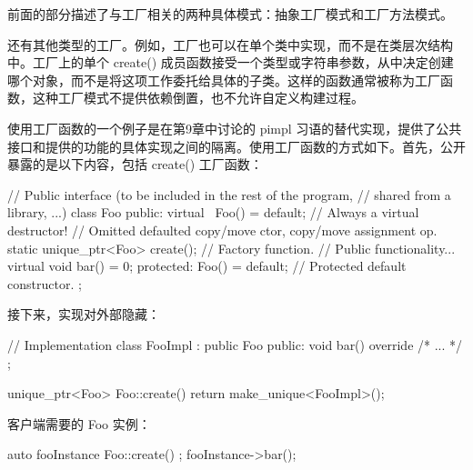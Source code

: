 前面的部分描述了与工厂相关的两种具体模式：抽象工厂模式和工厂方法模式。

还有其他类型的工厂。例如，工厂也可以在单个类中实现，而不是在类层次结构中。工厂上的单个 create() 成员函数接受一个类型或字符串参数，从中决定创建哪个对象，而不是将这项工作委托给具体的子类。这样的函数通常被称为工厂函数，这种工厂模式不提供依赖倒置，也不允许自定义构建过程。

使用工厂函数的一个例子是在第9章中讨论的 pimpl 习语的替代实现，提供了公共接口和提供的功能的具体实现之间的隔离。使用工厂函数的方式如下。首先，公开暴露的是以下内容，包括 create() 工厂函数：

\begin{cpp}
// Public interface (to be included in the rest of the program,
// shared from a library, ...)
class Foo
{
    public:
        virtual ~Foo() = default; // Always a virtual destructor!
        // Omitted defaulted copy/move ctor, copy/move assignment op.
        static unique_ptr<Foo> create(); // Factory function.
        // Public functionality...
        virtual void bar() = 0;
    protected:
        Foo() = default; // Protected default constructor.
};
\end{cpp}

接下来，实现对外部隐藏：

\begin{cpp}
// Implementation
class FooImpl : public Foo
{
    public:
    void bar() override { /* ... */ }
};

unique_ptr<Foo> Foo::create()
{
    return make_unique<FooImpl>();
}
\end{cpp}

客户端需要的 Foo 实例：

\begin{cpp}
auto fooInstance { Foo::create() };
fooInstance->bar();
\end{cpp}
